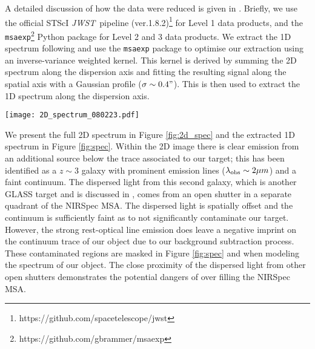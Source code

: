 \documentclass[sn-mathphys]{sn-jnl}%
\theoremstyle{thmstyleone}%
\theoremstyle{thmstyletwo}%
\theoremstyle{thmstylethree}%
\newcommand{\jwst}{\textit{JWST}}
\begin{document}
A detailed discussion of how the data were reduced is given in \cite{Morishita22}. Briefly, we use the official STScI \jwst\ pipeline (ver.1.8.2)\footnote{https://github.com/spacetelescope/jwst}
for Level 1 data products, and the
\texttt{msaexp}\footnote{https://github.com/gbrammer/msaexp}
Python package for Level 2 and 3 data products.
We extract the 1D spectrum following \cite{Morishita22} and use the \texttt{msaexp} package to optimise our extraction using an inverse-variance weighted kernel. This kernel is derived by summing the 2D spectrum along the dispersion axis and fitting the resulting signal along the spatial axis with a Gaussian profile ($\sigma\sim0.4"$). This is then used to extract the 1D spectrum along the dispersion axis. 

\begin{figure*}
    \centering
    \texttt{[image: 2D\_spectrum\_080223.pdf]}
    \caption{2D observed-frame high resolution $R\sim2700$ spectrum in the f100lp/g140h, f170lp/g235h and f290lp/g395h filter-disperser configurations. Orange and white dashed lines show the $1\sigma$ extraction trace for the optimal and narrow kernels. In the 2D extraction, the relative proximity of the dispersed light from other sources can be seen. These spectra are not associated with an additional source within our shutter but rather with targets in separate shutters in the NIRSpec MSA with a similar row number. The narrow kernel is introduced to ensure no contamination from the dispersed light of close proximity spectra is included for the fitting of the Lyman break. }
    \label{fig:2d_spec}
\end{figure*}

We present the full 2D spectrum in Figure \ref{fig:2d_spec} and the extracted 1D spectrum in Figure \ref{fig:spec}. Within the 2D image there is clear emission from an additional source below the trace associated to our target; this has been identified as a $z\sim3$ galaxy with prominent emission lines ($\lambda_{\rm obs}\sim2\mu m$) and a faint continuum. The dispersed light from this second galaxy, which is another GLASS target and is discussed in \cite{Boyett23b}, comes from an open shutter in a separate quadrant of the NIRSpec MSA. The dispersed light is spatially offset and the continuum is sufficiently faint as to not significantly contaminate our target. However, the strong rest-optical line emission does leave a negative imprint on the continuum trace of our object due to our background subtraction process. These contaminated regions are masked in Figure \ref{fig:spec} and when modeling the spectrum of our object. The close proximity of the dispersed light from other open shutters demonstrates the potential dangers of over filling the NIRSpec MSA.
\end{document}
